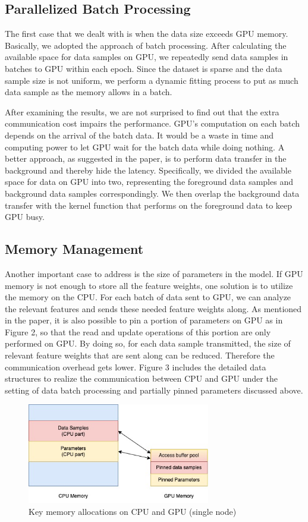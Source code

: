 \documentclass{article}
\begin{document}
\subsection*{Parallelized Batch Processing}

The first case that we dealt with is when the data size exceeds GPU memory. Basically, we adopted the approach of batch processing. After calculating the available space for data samples on GPU, we repeatedly send data samples in batches to GPU within each epoch. Since the dataset is sparse and the data sample size is not uniform, we perform a dynamic fitting process to put as much data sample as the memory allows in a batch.

After examining the results, we are not surprised to find out that the extra communication cost impairs the performance. GPU's computation on each batch depends on the arrival of the batch data. It would be a waste in time and computing power to let GPU wait for the batch data while doing nothing. A better approach, as suggested in the paper, is to perform data transfer in the background and thereby hide the latency. Specifically, we divided the available space for data on GPU into two, representing the foreground data samples and background data samples correspondingly. We then overlap the background data transfer with the kernel function that performs on the foreground data to keep GPU busy.

\subsection*{Memory Management}

Another important case to address is the size of parameters in the model. If GPU memory is not enough to store all the feature weights, one solution is to utilize the memory on the CPU. For each batch of data sent to GPU, we can analyze the relevant features and sends these needed feature weights along. As mentioned in the paper, it is also possible to pin a portion of parameters on GPU as in Figure 2, so that the read and update operations of this portion are only performed on GPU. By doing so, for each data sample transmitted, the size of relevant feature weights that are sent along can be reduced. Therefore the communication overhead gets lower. Figure 3 includes the detailed data structures to realize the communication between CPU and GPU under the setting of data batch processing and partially pinned parameters discussed above.

\begin{figure}[htp]
    \centering
    \includegraphics[width=8cm]{memory_management_1.jpg}
    \caption{Key memory allocations on CPU and GPU (single node)}
\end{figure}
\end{document}
